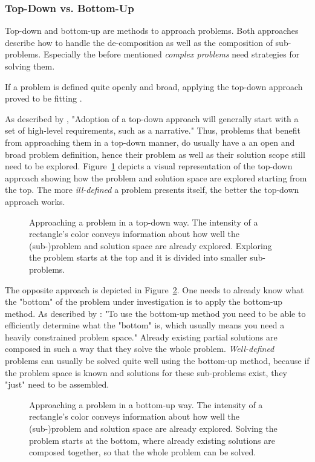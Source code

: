 \subsubsection{Top-Down vs. Bottom-Up}
Top-down and bottom-up are methods to approach problems.
Both approaches describe how to handle the de-composition as well as the composition of sub-problems.
Especially the before mentioned \emph{complex problems} need strategies for solving them.

If a problem is defined quite openly and broad, applying the top-down approach proved to be fitting \cite{kung_comparing_2013}.

As described by \citeauthor{kung_comparing_2013} \cite{kung_comparing_2013}, "Adoption of a top-down approach will generally start with a set of high-level requirements, such as a narrative."
Thus, problems that benefit from approaching them in a top-down manner, do usually have a an open and broad problem definition, hence their problem as well as their solution scope still need to be explored.
Figure~\ref{fig:top-down} depicts a visual representation of the top-down approach showing how the problem and solution space are explored starting from the top.
The more \emph{ill-defined} a problem presents itself, the better the top-down approach works.
%
\begin{figure}[h]
\centering
\hspace*{0.15\linewidth}

\caption{Approaching a problem in a top-down way. The intensity of a rectangle's color conveys information about how well the (sub-)problem and solution space are already explored. Exploring the problem starts at the top and it is divided into smaller sub-problems.}
\label{fig:top-down}
\end{figure}
%
The opposite approach is depicted in Figure~\ref{fig:bottom-up}.
One needs to already know what the "bottom" of the problem under investigation is to apply the bottom-up method.
As described by \citeauthor{jones_is_2011} \cite{jones_is_2011}: "To use the bottom-up method you need to be able to efficiently determine what the "bottom" is, which usually means you need a heavily constrained problem space."
Already existing partial solutions are composed in such a way that they solve the whole problem.
\emph{Well-defined} problems can usually be solved quite well using the bottom-up method, because if the problem space is known and solutions for these sub-problems exist, they "just" need to be assembled.
%
\begin{figure}
\centering
\hspace*{0.15\linewidth}

\caption{Approaching a problem in a bottom-up way. The intensity of a rectangle's color conveys information about how well the (sub-)problem and solution space are already explored. Solving the problem starts at the bottom, where already existing solutions are composed together, so that the whole problem can be solved.}
\label{fig:bottom-up}
\end{figure}
